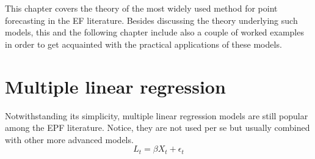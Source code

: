 This chapter covers the theory of the most widely used method for point forecasting in the EF literature. Besides discussing the theory underlying such models, this and the following chapter include also a couple of worked examples in order to get acquainted with the practical applications of these models.




\section{Multiple linear regression}
Notwithstanding its simplicity, multiple linear regression models are still popular among the EPF literature. Notice, they are not used per se but usually combined with other more advanced models.
\begin{equation}
    L_t=\beta X_t + \epsilon_t
\end{equation}


